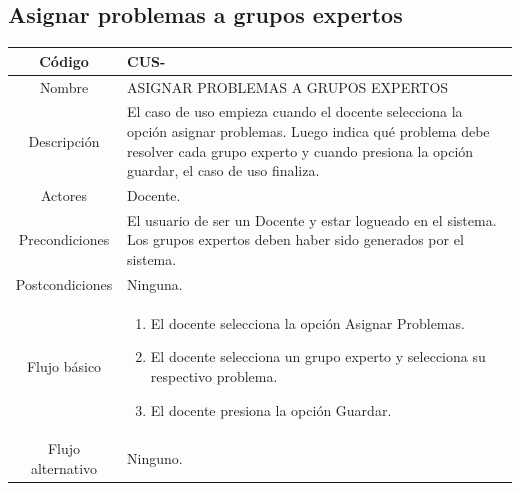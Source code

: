 \subsection{Asignar problemas a grupos expertos}
\begin{longtable}{|c|L{10cm}|}
	\toprule[0.8mm]
	Código &  CUS-\casodeuso\\  \midrule
	Nombre &  ASIGNAR PROBLEMAS A GRUPOS EXPERTOS\\  \midrule
	Descripción &  El caso de uso empieza cuando el docente selecciona la opción asignar problemas. Luego indica qué problema debe resolver cada grupo experto y cuando presiona la opción guardar, el caso de uso finaliza.\\  \midrule
	Actores &  Docente.\\  \midrule
	Precondiciones &  El usuario de ser un Docente y estar logueado en el sistema. Los grupos expertos deben haber sido generados por el sistema.\\  \midrule
	Postcondiciones &  Ninguna.\\  \midrule
	Flujo básico &    \begin{enumerate}
		\item El docente selecciona la opción Asignar Problemas.
		\item El docente selecciona un grupo experto y selecciona su respectivo problema.
		\item El docente presiona la opción Guardar.
	\end{enumerate}  \\ \midrule
	Flujo alternativo & Ninguno. \\  \bottomrule[0.8mm]
\end{longtable}
\clearpage
